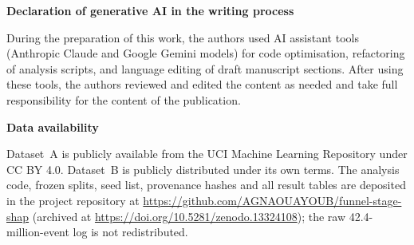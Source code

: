 \documentclass[11pt,a4paper]{article}
\begin{document}
\vspace{1.5em}
\noindent\textbf{Declaration of generative AI in the writing process}

\vspace{0.5em}
\noindent During the preparation of this work, the authors used AI assistant
tools (Anthropic Claude and Google Gemini models) for code optimisation,
refactoring of analysis scripts, and language editing of draft manuscript
sections. After using these tools, the authors reviewed and edited the content
as needed and take full responsibility for the content of the publication.

\vspace{1.5em}
\noindent\textbf{Data availability}

\vspace{0.5em}
\noindent Dataset~A is publicly available from the UCI Machine Learning
Repository under CC BY 4.0. Dataset~B is publicly distributed under its own terms.
The analysis code, frozen splits, seed list, provenance hashes and all result
tables are deposited in the project repository at \url{https://github.com/AGNAOUAYOUB/funnel-stage-shap} (archived at \url{https://doi.org/10.5281/zenodo.13324108});
the raw 42.4-million-event log is not redistributed.
\end{document}
